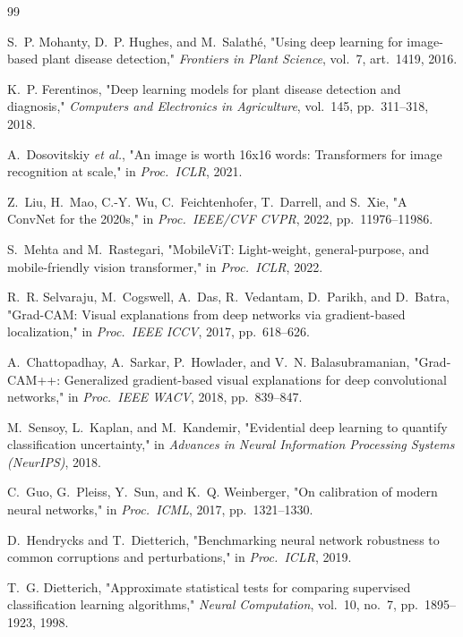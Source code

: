 \documentclass[10pt,twocolumn,a4paper]{article}
\begin{document}
\balance
{\footnotesize

\begin{thebibliography}{99}
\itemsep=0.6pt

 S.~P. Mohanty, D.~P. Hughes, and M.~Salath\'{e}, "Using deep learning for image-based plant disease detection," \emph{Frontiers in Plant Science}, vol.~7, art.~1419, 2016.

 K.~P. Ferentinos, "Deep learning models for plant disease detection and diagnosis," \emph{Computers and Electronics in Agriculture}, vol.~145, pp.~311--318, 2018.

 A.~Dosovitskiy \emph{et al.}, "An image is worth 16x16 words: Transformers for image recognition at scale," in \emph{Proc.\ ICLR}, 2021.

 Z.~Liu, H.~Mao, C.-Y. Wu, C.~Feichtenhofer, T.~Darrell, and S.~Xie, "A ConvNet for the 2020s," in \emph{Proc.\ IEEE/CVF CVPR}, 2022, pp.~11976--11986.

 S.~Mehta and M.~Rastegari, "MobileViT: Light-weight, general-purpose, and mobile-friendly vision transformer," in \emph{Proc.\ ICLR}, 2022.

 R.~R. Selvaraju, M.~Cogswell, A.~Das, R.~Vedantam, D.~Parikh, and D.~Batra, "Grad-CAM: Visual explanations from deep networks via gradient-based localization," in \emph{Proc.\ IEEE ICCV}, 2017, pp.~618--626.

 A.~Chattopadhay, A.~Sarkar, P.~Howlader, and V.~N. Balasubramanian, "Grad-CAM++: Generalized gradient-based visual explanations for deep convolutional networks," in \emph{Proc.\ IEEE WACV}, 2018, pp.~839--847.

 M.~Sensoy, L.~Kaplan, and M.~Kandemir, "Evidential deep learning to quantify classification uncertainty," in \emph{Advances in Neural Information Processing Systems (NeurIPS)}, 2018.

 C.~Guo, G.~Pleiss, Y.~Sun, and K.~Q. Weinberger, "On calibration of modern neural networks," in \emph{Proc.\ ICML}, 2017, pp.~1321--1330.

 D.~Hendrycks and T.~Dietterich, "Benchmarking neural network robustness to common corruptions and perturbations," in \emph{Proc.\ ICLR}, 2019.

 T.~G. Dietterich, "Approximate statistical tests for comparing supervised classification learning algorithms," \emph{Neural Computation}, vol.~10, no.~7, pp.~1895--1923, 1998.


\end{thebibliography}}
\end{document}
